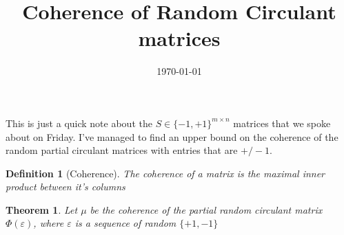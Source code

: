 \documentclass[11pt]{article}
\theoremstyle{break}
\newtheorem{thm}{Theorem}[section]
\newtheorem{definition}{Definition}[section]
\begin{document}
\title{Coherence of Random Circulant matrices}

\date{\today}

\maketitle
This is just a quick note about the \(S \in \{-1,+1\}^{m \times n}\) matrices that we spoke about on Friday. I've managed to find an upper bound on the coherence of the random partial circulant matrices with entries that are \(+/-1\).

\begin{definition}[Coherence]
The coherence of a matrix is the maximal inner product between it's columns
\end{definition}

\begin{thm}
Let \(\mu\) be the coherence of the partial random circulant matrix \(\Phi\left(\varepsilon\right)\), where \(\varepsilon\) is a sequence of random \(\{+1,-1\}\)
\end{thm}
\end{document}
